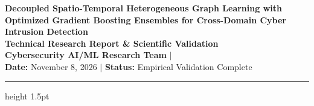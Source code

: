 \documentclass[11pt,a4paper]{article}
\begin{document}
\begin{center}
    {\LARGE \textbf{\color{primary} Decoupled Spatio-Temporal Heterogeneous Graph Learning with Optimized Gradient Boosting Ensembles for Cross-Domain Cyber Intrusion Detection}} \\[10pt]
    {\large \textbf{\color{secondary} Technical Research Report \& Scientific Validation}} \\[8pt]
    {\normalsize \textbf{Cybersecurity AI/ML Research Team}} \quad $\vert$  \\[4pt]
    {\small \textbf{Date:} November 8, 2026 \quad $\vert$ \quad \textbf{Status:} Empirical Validation Complete}
\end{center}

\vspace{8pt}
\hrule height 1.5pt
\vspace{12pt}
\end{document}
